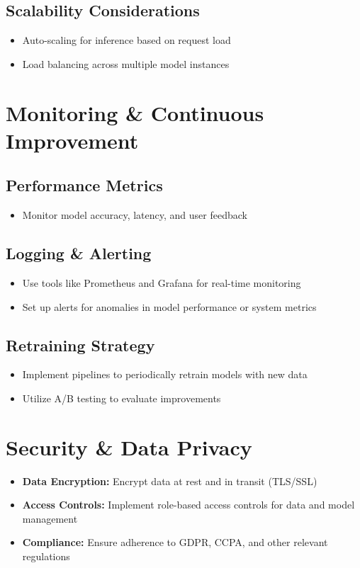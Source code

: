 \documentclass[11pt]{article}
\begin{document}
\subsection*{Scalability Considerations}
\begin{itemize}[noitemsep]
    \item Auto-scaling for inference based on request load
    \item Load balancing across multiple model instances
\end{itemize}

\section{Monitoring \& Continuous Improvement}
\subsection*{Performance Metrics}
\begin{itemize}[noitemsep]
    \item Monitor model accuracy, latency, and user feedback
\end{itemize}

\subsection*{Logging \& Alerting}
\begin{itemize}[noitemsep]
    \item Use tools like Prometheus and Grafana for real-time monitoring
    \item Set up alerts for anomalies in model performance or system metrics
\end{itemize}

\subsection*{Retraining Strategy}
\begin{itemize}[noitemsep]
    \item Implement pipelines to periodically retrain models with new data
    \item Utilize A/B testing to evaluate improvements
\end{itemize}

\section{Security \& Data Privacy}
\begin{itemize}[noitemsep]
    \item \textbf{Data Encryption:} Encrypt data at rest and in transit (TLS/SSL)
    \item \textbf{Access Controls:} Implement role-based access controls for data and model management
    \item \textbf{Compliance:} Ensure adherence to GDPR, CCPA, and other relevant regulations
\end{itemize}
\end{document}
